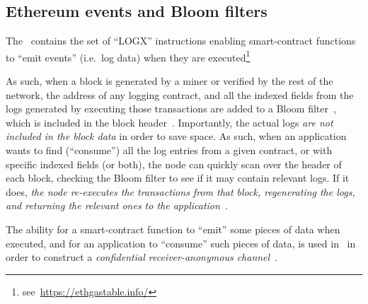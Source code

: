 \subsection{Ethereum events and Bloom filters}\label{sssec:ethereum-events}

The \evm~contains the set of ``LOGX'' instructions enabling smart-contract functions to ``emit events'' (i.e.~log data) when they are executed\footnote{see~\url{https://ethgastable.info/}}

As such, when a block is generated by a miner or verified by the rest of the network, the address of any logging contract, and all the indexed fields from the logs generated by executing those transactions are added to a Bloom filter~\cite{DBLP:journals/cacm/Bloom70}, which is included in the block header~\cite[Section 4.3]{ethyellowpaper}. Importantly, the actual logs \emph{are not included in the block data} in order to save space.
    As such, when an application wants to find (``consume'') all the log entries from a given contract, or with specific indexed fields (or both), the node can quickly scan over the header of each block, checking the Bloom filter to see if it may contain relevant logs. If it does, \emph{the node re-executes the transactions from that block, regenerating the logs, and returning the relevant ones to the application}~\cite{eth-bloom-filters}.

\begin{notebox}
    The ability for a smart-contract function to ``emit'' some pieces of data when executed, and for an application to ``consume'' such pieces of data, is used in \zeth~in order to construct a \emph{confidential receiver-anonymous channel}~\cite{DBLP:conf/pet/KohlweissMOTV13}.
\end{notebox}
